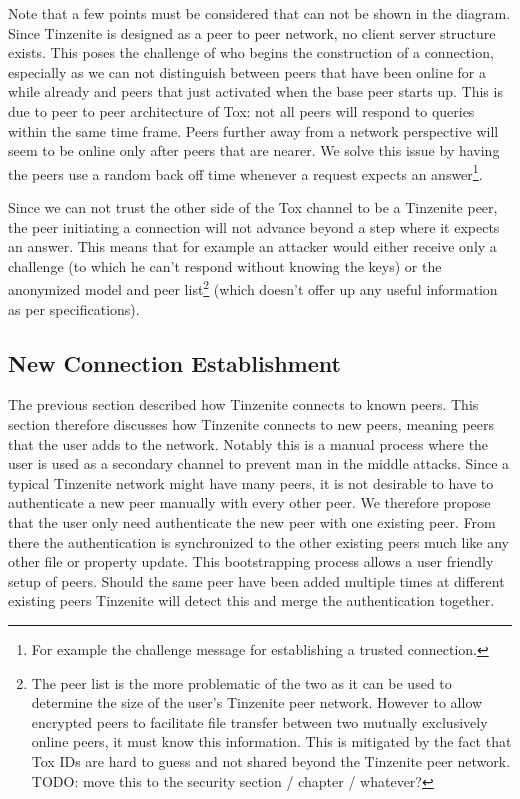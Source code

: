 Note that a few points must be considered that can not be shown in the diagram.
Since Tinzenite is designed as a peer to peer network, no client server structure exists.
This poses the challenge of who begins the construction of a connection, especially as we can not distinguish between peers that have been online for a while already and peers that just activated when the base peer starts up.
This is due to peer to peer architecture of Tox: not all peers will respond to queries within the same time frame.
Peers further away from a network perspective will seem to be online only after peers that are nearer.
We solve this issue by having the peers use a random back off time whenever a request expects an answer\footnote{For example the challenge message for establishing a trusted connection.}.

Since we can not trust the other side of the Tox channel to be a Tinzenite peer, the peer initiating a connection will not advance beyond a step where it expects an answer.
This means that for example an attacker would either receive only a challenge (to which he can't respond without knowing the keys) or the anonymized model and peer list\footnote{The peer list is the more problematic of the two as it can be used to determine the size of the user's Tinzenite peer network. However to allow encrypted peers to facilitate file transfer between two mutually exclusively online peers, it must know this information. This is mitigated by the fact that Tox IDs are hard to guess and not shared beyond the Tinzenite peer network. TODO: move this to the security section / chapter / whatever?} (which doesn't offer up any useful information as per specifications).

\subsection{New Connection Establishment}

The previous section described how Tinzenite connects to known peers.
This section therefore discusses how Tinzenite connects to new peers, meaning peers that the user adds to the network.
Notably this is a manual process where the user is used as a secondary channel to prevent man in the middle attacks.
Since a typical Tinzenite network might have many peers, it is not desirable to have to authenticate a new peer manually with every other peer.
We therefore propose that the user only need authenticate the new peer with one existing peer.
From there the authentication is synchronized to the other existing peers much like any other file or property update.
This bootstrapping process allows a user friendly setup of peers.
Should the same peer have been added multiple times at different existing peers Tinzenite will detect this and merge the authentication together.


